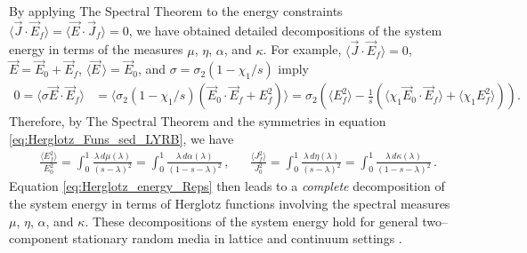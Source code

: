 \documentclass[english,12pt,jmp,graphicx]{revtex4-1}
\begin{document}
By applying The Spectral Theorem to the energy constraints
$\langle\vec{J}\cdot\vec{E}_f\rangle=\langle\vec{E}\cdot\vec{J}_f\rangle=0$, we have obtained detailed
decompositions of the system energy in terms of the measures $\mu$, $\eta$,
$\alpha$, and $\kappa$. For example, $\langle\vec{J}\cdot\vec{E}_f\rangle=0$,
$\vec{E}=\vec{E}_0+\vec{E}_f$, $\langle\vec{E}\,\rangle=\vec{E}_0$, and
$\sigma=\sigma_2(1-\chi_1/s)$ imply  
%
\begin{align*}
  0=\langle\sigma\vec{E}\cdot\vec{E}_f\rangle&=\langle\sigma_2(1-\chi_1/s)(\vec{E}_0\cdot\vec{E}_f+E_f^2)\rangle
 =\sigma_2\left(\langle E_f^2\rangle- \frac{1}{s}\left(\langle\chi_1\vec{E}_0\cdot\vec{E}_f\rangle
     + \langle\chi_1E_f^2\rangle\right)\right).
\end{align*}
%
Therefore, by The Spectral Theorem \cite{Reed-1980} and the symmetries
in equation \eqref{eq:Herglotz_Funs_sed_LYRB}, we have
%
\begin{align}\label{eq:Herglotz_energy_Reps}
 &\frac{\langle E_f^2\rangle}{E_0^2}=\int_0^1 \frac{\lambda\,d\mu(\lambda)}{(s-\lambda)^2}
           =\int_0^1 \frac{\lambda\,d\alpha(\lambda)}{(1-s-\lambda)^2}\,, &&
 \frac{\langle J_f^2\rangle}{J_0^2}=\int_0^1 \frac{\lambda\,d\eta(\lambda)}{(s-\lambda)^2}
           =\int_0^1 \frac{\lambda\,d\kappa(\lambda)}{(1-s-\lambda)^2}\,.
\end{align}
%
Equation \eqref{eq:Herglotz_energy_Reps} then leads to a
\emph{complete} decomposition of the system energy in terms of
Herglotz functions involving the spectral measures $\mu$, $\eta$, $\alpha$, and
$\kappa$.
These decompositions of the system energy hold for general
two--component stationary random media in lattice and continuum
settings \cite{Golden:PRL-3935}.  
\end{document}
